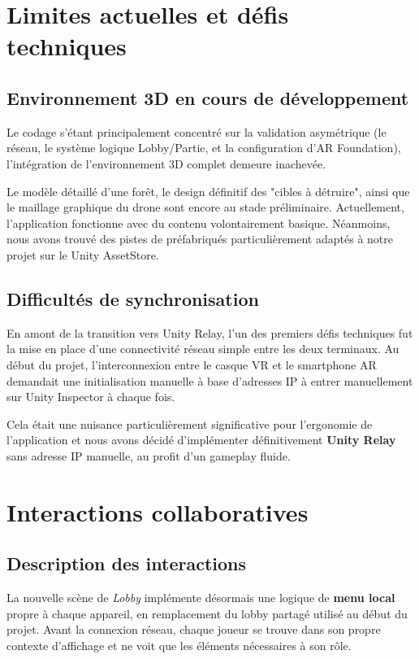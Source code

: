 \documentclass[12pt, a4paper]{article}
\begin{document}
\section{Limites actuelles et défis techniques}

\subsection{Environnement 3D en cours de développement}

Le codage s'étant principalement concentré sur la validation asymétrique (le réseau, le système logique Lobby/Partie, et la configuration d'AR Foundation), l'intégration de l'environnement 3D complet demeure inachevée.

Le modèle détaillé d'une forêt, le design définitif des "cibles à détruire", ainsi que le maillage graphique du drone sont encore au stade préliminaire. Actuellement, l'application fonctionne avec du contenu volontairement basique. Néanmoins, nous avons trouvé des pistes de préfabriqués particulièrement adaptés à notre projet sur le Unity AssetStore.

\subsection{Difficultés de synchronisation}

En amont de la transition vers Unity Relay, l'un des premiers défis techniques fut la mise en place d'une connectivité réseau simple entre les deux terminaux. Au début du projet, l'interconnexion entre le casque VR et le smartphone AR demandait une initialisation manuelle à base d'adresses IP à entrer manuellement sur Unity Inspector à chaque fois.

Cela était une nuisance particulièrement significative pour l'ergonomie de l'application et nous avons décidé d'implémenter définitivement \textbf{Unity Relay} sans adresse IP manuelle, au profit d'un gameplay fluide.

\section{Interactions collaboratives}

\subsection{Description des interactions}

La nouvelle scène de \textit{Lobby} implémente désormais une logique de \textbf{menu local} propre à chaque appareil, en remplacement du lobby partagé utilisé au début du projet. Avant la connexion réseau, chaque joueur se trouve dans son propre contexte d'affichage et ne voit que les éléments nécessaires à son rôle.
\end{document}
